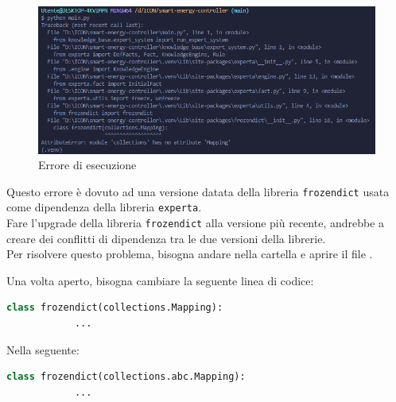 \documentclass[12pt, letterpaper]{article}
\begin{document}
\begin{figure}[h]
      \centering
      \includegraphics[scale=0.55]{errore-python.png}
      \caption{Errore di esecuzione}
\end{figure}

\noindent Questo errore è dovuto ad una versione datata della libreria \texttt{frozendict}
usata come dipendenza della libreria \texttt{experta}. \\

\noindent Fare l'upgrade della libreria \texttt{frozendict} alla versione più recente, andrebbe a
creare dei conflitti di dipendenza tra le due versioni della librerie. \\

\noindent Per risolvere questo problema, bisogna andare nella cartella
 e aprire il file .

\noindent Una volta aperto, bisogna cambiare la seguente linea di codice: \\

\begin{lstlisting}[language=Python]
      class frozendict(collections.Mapping):
            ...
\end{lstlisting}

\noindent Nella seguente:

\begin{lstlisting}[language=Python]
      class frozendict(collections.abc.Mapping):
            ...
\end{lstlisting}
\end{document}
